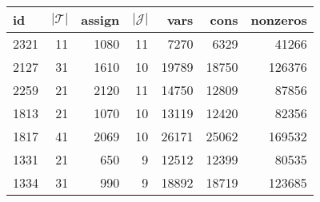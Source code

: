\begin{tabular}{lrrrrrr}
\toprule
   id &  $|\mathcal{T}|$ &  assign &  $|\mathcal{J}|$ &  vars &  cons &  nonzeros \\
\midrule
 2321 &               11 &    1080 &               11 &  7270 &  6329 &     41266 \\
 2127 &               31 &    1610 &               10 & 19789 & 18750 &    126376 \\
 2259 &               21 &    2120 &               11 & 14750 & 12809 &     87856 \\
 1813 &               21 &    1070 &               10 & 13119 & 12420 &     82356 \\
 1817 &               41 &    2069 &               10 & 26171 & 25062 &    169532 \\
 1331 &               21 &     650 &                9 & 12512 & 12399 &     80535 \\
 1334 &               31 &     990 &                9 & 18892 & 18719 &    123685 \\
\bottomrule
\end{tabular}
